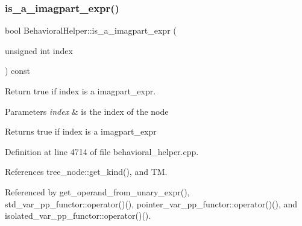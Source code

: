 \subsubsection{\texorpdfstring{is\+\_\+a\+\_\+imagpart\+\_\+expr()}{is\_a\_imagpart\_expr()}}
{\footnotesize\ttfamily bool Behavioral\+Helper\+::is\+\_\+a\+\_\+imagpart\+\_\+expr (\begin{DoxyParamCaption}\item[{unsigned int}]{index }\end{DoxyParamCaption}) const\hspace{0.3cm}{\ttfamily [virtual]}}



Return true if index is a imagpart\+\_\+expr. 


\begin{DoxyParams}{Parameters}
{\em index} & is the index of the node \\
\hline
\end{DoxyParams}
\begin{DoxyReturn}{Returns}
true if index is a imagpart\+\_\+expr 
\end{DoxyReturn}


Definition at line 4714 of file behavioral\+\_\+helper.\+cpp.



References tree\+\_\+node\+::get\+\_\+kind(), and TM.



Referenced by get\+\_\+operand\+\_\+from\+\_\+unary\+\_\+expr(), std\+\_\+var\+\_\+pp\+\_\+functor\+::operator()(), pointer\+\_\+var\+\_\+pp\+\_\+functor\+::operator()(), and isolated\+\_\+var\+\_\+pp\+\_\+functor\+::operator()().

